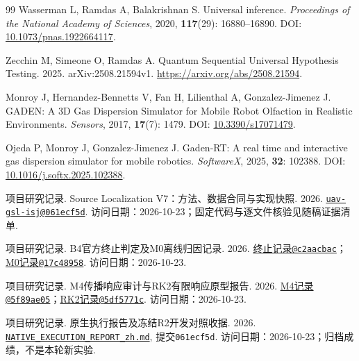 \begin{thebibliography}{99}
Wasserman L, Ramdas A, Balakrishnan S. Universal inference. {\sl Proceedings of the National Academy of Sciences}, 2020, {\bf 117}(29): 16880--16890. DOI: \url{10.1073/pnas.1922664117}.

Zecchin M, Simeone O, Ramdas A. Quantum Sequential Universal Hypothesis Testing. 2025. arXiv:2508.21594v1. \url{https://arxiv.org/abs/2508.21594}.

Monroy J, Hernandez-Bennetts V, Fan H, Lilienthal A, Gonzalez-Jimenez J. {GADEN}: A {3D} Gas Dispersion Simulator for Mobile Robot Olfaction in Realistic Environments. {\sl Sensors}, 2017, {\bf 17}(7): 1479. DOI: \url{10.3390/s17071479}.

Ojeda P, Monroy J, Gonzalez-Jimenez J. {Gaden-RT}: A real time and interactive gas dispersion simulator for mobile robotics. {\sl SoftwareX}, 2025, {\bf 32}: 102388. DOI: \url{10.1016/j.softx.2025.102388}.

项目研究记录. Source Localization V7：方法、数据合同与实现快照. 2026. \href{https://github.com/kris-yun/uav-gsl-isj/tree/061ecf5ddea0a59dcf932b5038ad646b7af454a4/research/source_localization_v7}{\texttt{uav-gsl-isj@061ecf5d}}. 访问日期：2026-10-23；固定代码与逐文件核验见随稿证据清单.

项目研究记录. B4官方终止判定及M0离线归因记录. 2026. \href{https://github.com/kris-yun/uav-gsl-isj/blob/c2aacbac7fb2ef7be4be3c9c7dcfce20c11f823c/research/pmfs_reproduction/b4_official_terminal_resumed_20261010/B4_OFFICIAL_TERMINAL_DECISION_zh.md}{终止记录\texttt{@c2aacbac}}；\href{https://github.com/kris-yun/uav-gsl-isj/blob/17c48958f9d7eda98dd61b8e656a8c52205cb7d7/research/pmfs_reproduction/b4_m0_offline_attribution_20261010/B4_M0_EVIDENCE_ATTRIBUTION_zh.md}{M0记录\texttt{@17c48958}}. 访问日期：2026-10-23.

项目研究记录. M4传播响应审计与RK2有限响应原型报告. 2026. \href{https://github.com/kris-yun/uav-gsl-isj/blob/5f89ae05e29714cc31d006638c5067e6813e7077/evidence/causal_compositional_plume_world_model_v1/M4_V2_FROZEN_TRANSPORT_RESPONSE_AUDIT_20260923.md}{M4记录\texttt{@5f89ae05}}；\href{https://github.com/kris-yun/uav-gsl-isj/blob/5df5771ca916f209d041e3e3ecd548ec65eb8424/research/pmfs_reproduction/PMFS_RK2_FINITE_RESPONSE_PROTOTYPE_20261010/RK2_FINITE_PROTOTYPE_REPORT_zh.md}{RK2记录\texttt{@5df5771c}}. 访问日期：2026-10-23.

项目研究记录. 原生执行报告及冻结R2开发对照收据. 2026. \href{https://github.com/kris-yun/uav-gsl-isj/blob/061ecf5ddea0a59dcf932b5038ad646b7af454a4/research/source_localization_v7/NATIVE_EXECUTION_REPORT_zh.md}{\texttt{NATIVE\_EXECUTION\_REPORT\_zh.md}}, 提交\texttt{061ecf5d}. 访问日期：2026-10-23；归档成绩，不是本轮新实验.


\end{thebibliography}

